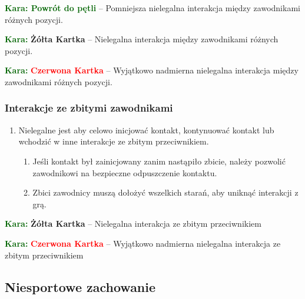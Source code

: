 \documentclass[11pt,a4paper]{article}
\newcommand\redcard[1]{\bgroup\textcolor{darkgreen}{\textbf{Kara: }}\bgroup\textcolor{red}{\textbf{Czerwona Kartka}} -- #1}
\newcommand\yellowcard[1]{\bgroup\textcolor{darkgreen}{\textbf{Kara: }}\bgroup\textcolor{darkyellow}{\textbf{Żółta Kartka}} -- #1}
\newcommand\penaltyd[2]{\bgroup\textcolor{darkgreen}{\textbf{Kara: #1}} -- #2}
\begin{document}
\penaltyd{Powrót do pętli}{Pomniejsza nielegalna interakcja między zawodnikami różnych pozycji.}

\yellowcard{Nielegalna interakcja między zawodnikami różnych pozycji.}

\redcard{Wyjątkowo nadmierna nielegalna interakcja między zawodnikami różnych pozycji.}

\subsubsection{Interakcje ze zbitymi zawodnikami}
\begin{enumerate}
  \item Nielegalne jest aby celowo inicjować kontakt, kontynuować kontakt lub wchodzić w inne interakcje ze zbitym przeciwnikiem.
  \begin{enumerate}
    \item Jeśli kontakt był zainicjowany zanim nastąpiło zbicie, należy pozwolić zawodnikowi na bezpieczne odpuszczenie kontaktu.
    \item Zbici zawodnicy muszą dołożyć wszelkich starań, aby uniknąć interakcji z grą.
  \end{enumerate}
\end{enumerate}

\yellowcard{Nielegalna interakcja ze zbitym przeciwnikiem}

\redcard{Wyjątkowo nadmierna nielegalna interakcja ze zbitym przeciwnikiem}

\subsection{Niesportowe zachowanie}
\end{document}
